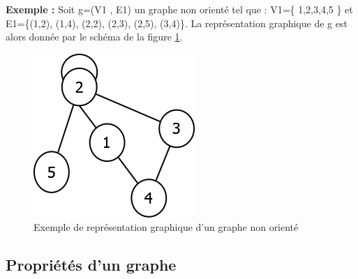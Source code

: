 \textbf{Exemple :}
 Soit g=(V1 , E1) un graphe non orienté tel que : V1=\{ 1,2,3,4,5 \} et E1=\{(1,2), (1,4), (2,2), (2,3), (2,5), (3,4)\}.
La représentation graphique de g est alors donnée par le schéma de la figure \ref{graphNonOriente}.
\\
\begin{figure}[H]
\begin{center}
\includegraphics[height=120 pt, width=130 pt]{./ressources/image/graphNonOriente.png} 
\end{center}
\caption{Exemple de représentation graphique d'un graphe non orienté}
\label{graphNonOriente}
\end{figure}

		\subsection{Propriétés d'un graphe}
		

